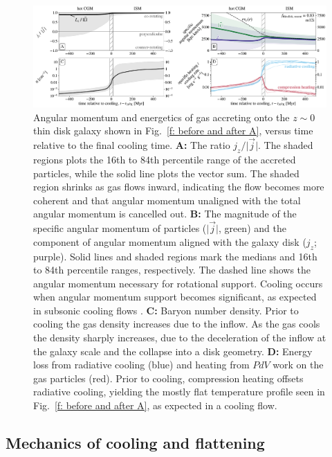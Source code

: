 \documentclass[fleqn,usenatbib]{mnras}
\begin{document}
\begin{figure}
\includegraphics[width=\textwidth]{figures/before_and_after/before_and_after_m12i_md.pdf}
\caption{
Angular momentum and energetics of gas accreting onto the $z\sim0$ thin disk galaxy shown in Fig.~\ref{f: before and after A}, versus time relative to the final cooling time.
\textbf{A:}
The ratio $j_z / \vert \vec j \vert$.
The shaded regions plots the 16th to 84th percentile range of the accreted particles, while the solid line plots the vector sum.
The shaded region shrinks as gas flows inward, indicating the flow becomes more coherent and that angular momentum unaligned with the total angular momentum is cancelled out. 
\textbf{B:}
The magnitude of the specific angular momentum of particles ($\vert\vec{j}\vert$, green) and the component of angular momentum aligned with the galaxy disk ($j_z$; purple).
Solid lines and shaded regions mark the medians and 16th to 84th percentile ranges, respectively. 
The dashed line shows the angular momentum necessary for rotational support.
Cooling occurs when angular momentum support becomes significant, as expected in subsonic cooling flows \citep{Cowie1980, Stern2020}.
\textbf{C:}
Baryon number density.
Prior to cooling the gas density increases due to the inflow.
As the gas cools the density sharply increases, due to the deceleration of the inflow at the galaxy scale and the collapse into a disk geometry. 
\textbf{D:}
Energy loss from radiative cooling (blue) and heating from $PdV$ work on the gas particles (red).
Prior to cooling, compression heating offsets radiative cooling, yielding the mostly flat temperature profile seen in Fig.~\ref{f: before and after A}, as expected in a cooling flow.
}
\label{f: before and after B}
\end{figure}

\subsection{Mechanics of cooling and flattening}
\label{s: mechanics -- energy balance}
\end{document}
